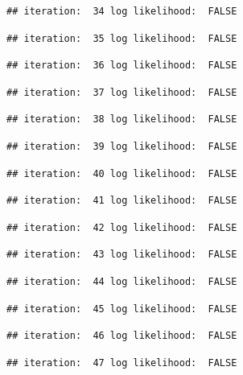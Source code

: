 \documentclass[
]{article}
\begin{document}
\begin{lstlisting}
## iteration:  34 log likelihood:  FALSE
\end{lstlisting}

\begin{lstlisting}
## iteration:  35 log likelihood:  FALSE
\end{lstlisting}

\begin{lstlisting}
## iteration:  36 log likelihood:  FALSE
\end{lstlisting}

\begin{lstlisting}
## iteration:  37 log likelihood:  FALSE
\end{lstlisting}

\begin{lstlisting}
## iteration:  38 log likelihood:  FALSE
\end{lstlisting}

\begin{lstlisting}
## iteration:  39 log likelihood:  FALSE
\end{lstlisting}

\begin{lstlisting}
## iteration:  40 log likelihood:  FALSE
\end{lstlisting}

\begin{lstlisting}
## iteration:  41 log likelihood:  FALSE
\end{lstlisting}

\begin{lstlisting}
## iteration:  42 log likelihood:  FALSE
\end{lstlisting}

\begin{lstlisting}
## iteration:  43 log likelihood:  FALSE
\end{lstlisting}

\begin{lstlisting}
## iteration:  44 log likelihood:  FALSE
\end{lstlisting}

\begin{lstlisting}
## iteration:  45 log likelihood:  FALSE
\end{lstlisting}

\begin{lstlisting}
## iteration:  46 log likelihood:  FALSE
\end{lstlisting}

\begin{lstlisting}
## iteration:  47 log likelihood:  FALSE
\end{lstlisting}
\end{document}
